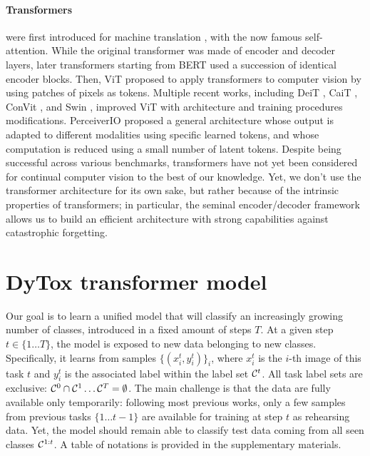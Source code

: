 \paragraph{Transformers} were first introduced for machine translation
\cite{vaswani2017transformer}, with the now famous self-attention. While the original transformer
was made of encoder and decoder layers, later transformers starting from BERT \cite{devlin2018bert}
used a succession of identical encoder blocks. Then, ViT \cite{dosovitskiy2020vit} proposed to apply
transformers to computer vision by using patches of pixels as tokens. Multiple recent works,
including DeiT \cite{touvron2021deit}, CaiT \cite{touvron2021cait}, ConVit \cite{dascoli2021convit},
and Swin \cite{liu2021swin}, improved ViT with architecture and training procedures modifications.
PerceiverIO \cite{jaegle2021perceiverio} proposed a general architecture whose output is adapted to
different modalities using specific learned tokens, and whose computation is reduced using a small
number of latent tokens. Despite being successful across various benchmarks, transformers have not
yet been considered for continual computer vision to the best of our knowledge. Yet, we don't use
the transformer architecture for its own sake, but rather because of the intrinsic properties of
transformers; in particular, the seminal encoder/decoder framework allows us to build an efficient
architecture with strong capabilities against catastrophic forgetting.

\section{DyTox transformer model}
\label{sec:dytox_model}


\label{sec:dytox_problem}


Our goal is to learn a unified model that will classify an increasingly growing number of classes,
introduced in a fixed amount of steps $T$. At a given step $t \in \{1 \dots T\}$, the model is
exposed to new data belonging to new classes. Specifically, it learns from samples $\{(x_i^t,
    y_i^t)\}_{i}$, where $x_i^t$ is the $i$-th image of this task $t$ and $y_i^t$ is the associated
label within the label set $\mathcal{C}^t$. All task label sets are exclusive: $\mathcal{C}^0 \cap \mathcal{C}^1 \dots
    \mathcal{C}^T = \emptyset$. The main challenge is that the data are fully available only temporarily:
following most previous works, only a few samples from previous tasks $\{1 \dots t-1\}$ are
available for training at step $t$ as rehearsing data. Yet, the model should remain able to classify
test data coming from all seen classes $\mathcal{C}^{1:t}$. A table of notations is provided in the
supplementary materials.

